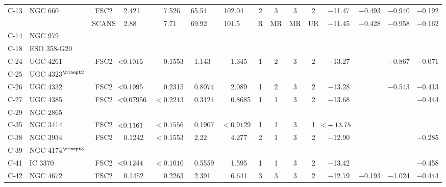 \begin{tabular}{|c|l|c|rrrr|cccc|c|ccc|}
C-13 & NGC 660       & FSC2	&2.421$\phantom{00}$& 7.526$\phantom{0}$ & 65.54$\phantom{00}$ & 102.04$\phantom{00}$ & 2	& 3	& 3	& 2 & $-$11.47 & $-$0.493 & $-$0.940 & $-$0.192\\
     & 		     & SCANS	&2.88$\phantom{000}$& 7.71$\phantom{00}$& 69.92$\phantom{00}$  & 101.5$\phantom{000}$  & R &	MR &	MR	& UR& $-$11.45 & $-$0.428 & $-$0.958 & $-$0.162\\
[8pt]
C-14 & NGC 979       &	    	& 	  &		&	 &	  &   	&	&	&   &	   &   &          &	    \\
C-18 & ESO 358-G20   &	    	& 	  &		&	 &	  &   	&	&	&   &	   &   &          &	    \\
C-24 & UGC 4261      & FSC2	&$\llap{$<$}0.1015\phantom{0}$& 0.1553      & 1.143$\phantom{0}$ & 1.345$\phantom{0}$  & 1	& 2	& 3	& 2 & $-$13.27 &  & $-$0.867 & $-$0.071\\
C-25 & UGC 4323$^{\ninept 2}$&	    	& 	  &		&	 &	  &   	&	&	&   &	   &  &          &	    \\
[8pt]
C-26 & UGC 4332      & FSC2	&$\llap{$<$}0.1995\phantom{0}$& 0.2315	& 0.8074 & 2.089$\phantom{0}$  & 1	& 2	& 3	& 2 & $-$13.28 &  & $-$0.543 & $-$0.413\\
C-27 & UGC 4385      & FSC2	&$\llap{$<$}0.07956$& $<0.2213$ & 0.3124 & 0.8685 & 1	& 1	& 3	& 2 & $-$13.68 &   &          & $-$0.444\\
C-29 & NGC 2865      &	   	& 	  &		&	 &	  &   	&	&	&   &	  &    &          &	    \\
C-35 & NGC 3414      & FSC2	&$\llap{$<$}0.1161\phantom{0}$& $<0.1556$  & 0.1907 &$<0.9129$& 1	& 1	& 3	& 1 & $\llap{$<$}-13.75$ 
&  &          &	    \\
[8pt]
C-38 & NGC 3934      & FSC2	&0.1242$\phantom{0}$& $<0.1553$   & 2.22$\phantom{00}$ & 4.277$\phantom{0}$  & 2	& 1	& 3	& 2 & $-$12.90 &  &          & $-$0.285\\
C-39 & NGC 4174$^{\ninept 3}$&	    	& 	  &		&	 &	  &   	&	&	&   &	      &  &          &         \\
C-41 & IC 3370       & FSC2	&$\llap{$<$}0.1244\phantom{0}$& $<0.1010$  & 0.5559 & 1.595$\phantom{0}$  & 1	& 1	& 3	& 2 & $-$13.42 &  &          & $-$0.458\\
C-42 & NGC 4672      & FSC2	&0.1452$\phantom{0}$  & 0.2263	& 2.391$\phantom{0}$ & 6.641$\phantom{0}$  & 3	& 3	& 3	& 2 & $-$12.79 & $-$0.193 & $-$1.024 & $-$0.444\\
[4pt]\hline
\end{tabular}
\vfil\eject
